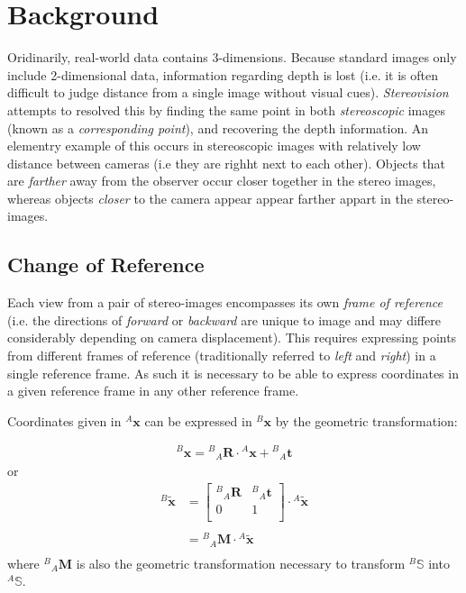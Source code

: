 \documentclass{report}
\newcommand{\tR}[0]{\ensuremath{^{A}}}
\newcommand{\bR}[0]{\ensuremath{_{A}}}
\newcommand{\tL}[0]{\ensuremath{^{B}}}
\newcommand{\rL}[0]{\ensuremath{{\tL\bR}}}
\newcommand{\xL}[0]{\ensuremath{{\tL\mathbf{x}}}}
\newcommand{\xR}[0]{\ensuremath{{\tR\mathbf{x}}}}
\newcommand{\hxL}[0]{\ensuremath{{\tL\tilde{\mathbf{x}}}}}
\newcommand{\hxR}[0]{\ensuremath{{\tR\tilde{\mathbf{x}}}}}
\newcommand{\rLM}[0]{\ensuremath{{\tL\bR}\mathbf{M}}}
\newcommand{\rLR}[0]{\ensuremath{{\tL\bR}\mathbf{R}}}
\newcommand{\rLt}[0]{\ensuremath{{\tL\bR}\mathbf{t}}}
\newcommand{\sR}[0]{\ensuremath{^{A}\mathbb{S}}}
\newcommand{\sL}[0]{\ensuremath{^{B}\mathbb{S}}}
\begin{document}
\chapter{Background}

\par Oridinarily, real-world data contains 3-dimensions. 
Because standard images only include 2-dimensional data, information regarding depth is lost (i.e. it is often difficult to judge distance from a single image without visual cues). 
\textit{Stereovision} attempts to resolved this by finding the same point in both \textit{stereoscopic} images (known as a \textit{corresponding point}), and recovering the depth information.
An elementry example of this occurs in stereoscopic images with relatively low distance between cameras (i.e they are righht next to each other). 
Objects that are \textit{farther} away from the observer occur closer together in the stereo images, whereas objects \textit{closer} to the camera appear appear farther appart in the stereo-images.

\section{Change of Reference}

\par Each view from a pair of stereo-images encompasses its own \textit{frame of reference} (i.e. the directions of \textit{forward} or \textit{backward} are unique to image and may differe considerably depending on camera displacement).
This requires expressing points from different frames of reference (traditionally referred to \textit{left} and \textit{right}) in a single reference frame. 
As such it is necessary to be able to express coordinates in a given reference frame in any other reference frame.

\par Coordinates given in $\xR$ can be expressed in $\xL$ by the geometric transformation:
\renewcommand{\arraystretch}{1.5}
\par
\begin{align*}
	\xL = \rLR \cdot \xR + \rLt
\end{align*}
or
\begin{align*}
	\hxL &=
	\left[\begin{array}{c|c}
		\rL\textbf{R} & \rL\textbf{t} \\\hline
		0 & 1 \\
	\end{array}\right]
	\cdot\hxR \\
	&\\
	&= \rLM\cdot\hxR\\
\end{align*}
where $\rLM$ is also the geometric transformation necessary to transform $\sL$ into $\sR$. 
\end{document}
